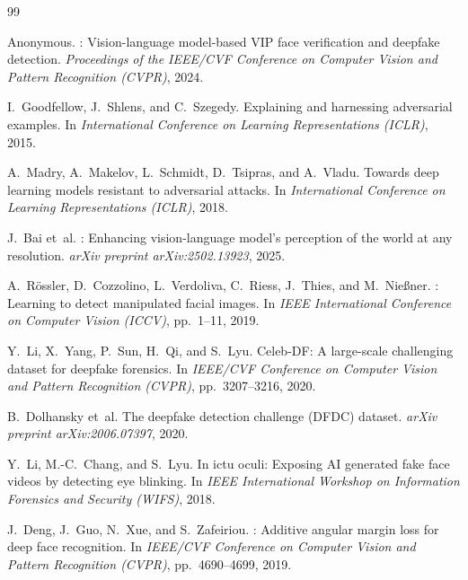 \documentclass[12pt,a4paper]{article}
\begin{document}

\begin{thebibliography}{99}

Anonymous.
: Vision-language model-based VIP face verification and
  deepfake detection.
\newblock \textit{Proceedings of the IEEE/CVF Conference on Computer Vision and Pattern Recognition (CVPR)}, 2024.

I.~Goodfellow, J.~Shlens, and C.~Szegedy.
\newblock Explaining and harnessing adversarial examples.
\newblock In \textit{International Conference on Learning Representations (ICLR)}, 2015.

A.~Madry, A.~Makelov, L.~Schmidt, D.~Tsipras, and A.~Vladu.
\newblock Towards deep learning models resistant to adversarial attacks.
\newblock In \textit{International Conference on Learning Representations (ICLR)}, 2018.

J.~Bai et~al.
: Enhancing vision-language model's perception of the world at any resolution.
\newblock \textit{arXiv preprint arXiv:2502.13923}, 2025.

A.~R{\"o}ssler, D.~Cozzolino, L.~Verdoliva, C.~Riess, J.~Thies, and M.~Nie{\ss}ner.
: Learning to detect manipulated facial images.
\newblock In \textit{IEEE International Conference on Computer Vision (ICCV)}, pp.~1--11, 2019.

Y.~Li, X.~Yang, P.~Sun, H.~Qi, and S.~Lyu.
\newblock Celeb-{DF}: A large-scale challenging dataset for deepfake forensics.
\newblock In \textit{IEEE/CVF Conference on Computer Vision and Pattern Recognition (CVPR)}, pp.~3207--3216, 2020.

B.~Dolhansky et~al.
\newblock The deepfake detection challenge ({DFDC}) dataset.
\newblock \textit{arXiv preprint arXiv:2006.07397}, 2020.

Y.~Li, M.-C.~Chang, and S.~Lyu.
\newblock In ictu oculi: Exposing {AI} generated fake face videos by detecting eye blinking.
\newblock In \textit{IEEE International Workshop on Information Forensics and Security (WIFS)}, 2018.

J.~Deng, J.~Guo, N.~Xue, and S.~Zafeiriou.
: Additive angular margin loss for deep face recognition.
\newblock In \textit{IEEE/CVF Conference on Computer Vision and Pattern Recognition (CVPR)}, pp.~4690--4699, 2019.


\end{thebibliography}
\end{document}
